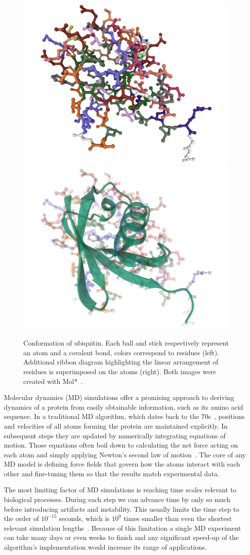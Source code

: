 \begin{figure}[ht]
  
  \centering
  \includegraphics[width = 0.49 \textwidth]{graphics/ubq_balls.png}
  \includegraphics[width = 0.49 \textwidth]{graphics/ubq_ribbon.png}
  \caption{Conformation of ubiquitin. Each ball and stick respectively represent an atom and a covalent bond, colors correspond to residues (left). 
  Additional ribbon diagram highlighting the linear arrangement of residues is superimposed on the atoms (right). 
  Both images were created with Mol*~\cite{mol}.}
  \label{f:ubq}
\end{figure}


Molecular dynamics (MD) simulations offer a promising approach to deriving dynamics of a protein
from easily obtainable information, such as its amino acid sequence. 
In a traditional MD algorithm, which dates back to the 70s~\cite{md_nature}, positions and velocities
of all atoms forming the protein are maintained explicitly. In subsequent steps they are updated 
by numerically integrating equations of motion. Those equations often boil down to calculating the net
force acting on each atom and simply applying Newton's second law of motion~\cite{md_aa}. 
The core of any MD model is defining force fields that govern how the atoms interact with each other
and fine-tuning them so that the results match experimental data.

The most limiting factor of MD simulations is reaching time scales relevant to biological processes.
During each step we can advance time by only so much before introducing artifacts and instability.
This usually limits the time step to the order of $10^{-15}$ seconds, which is $10^9$ times smaller than 
even the shortest relevant simulation lengths~\cite{md_aa}. 
Because of this limitation a single MD experiment can take many days or even weeks to finish 
and any significant speed-up of the algorithm's implementation would increase its range of applications. 

